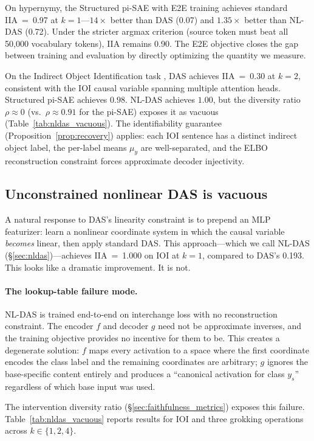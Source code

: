 \documentclass{article}
\begin{document}
On hypernymy, the Structured pi-SAE with E2E training achieves standard
IIA~=~0.97 at $k{=}1$---$14\times$ better than DAS (0.07) and $1.35\times$
better than NL-DAS (0.72). Under the stricter argmax criterion (source token
must beat all 50{,}000 vocabulary tokens), IIA remains 0.90. The E2E objective
closes the gap between training and evaluation by directly optimizing the
quantity we measure.

On the Indirect Object Identification task \citep{wang2022interpretability},
DAS achieves IIA~=~0.30 at $k{=}2$, consistent with the IOI causal
variable spanning multiple attention heads.  Structured pi-SAE achieves
$0.98$.  NL-DAS achieves $1.00$, but the diversity ratio $\rho \approx 0$
(vs.\ $\rho \approx 0.91$ for the pi-SAE) exposes it as vacuous
(Table~\ref{tab:nldas_vacuous}).  The identifiability guarantee
(Proposition~\ref{prop:recovery}) applies: each IOI sentence has a distinct
indirect object label, the per-label means $\mu_y$ are well-separated, and
the ELBO reconstruction constraint forces approximate decoder injectivity.

\subsection{Unconstrained nonlinear DAS is vacuous}
\label{sec:nldas_vacuous}

A natural response to DAS's linearity constraint is to prepend an MLP
featurizer: learn a nonlinear coordinate system in which the causal variable
\emph{becomes} linear, then apply standard DAS. This approach---which we call
NL-DAS (\S\ref{sec:nldas})---achieves IIA~=~1.000 on IOI at $k = 1$, compared
to DAS's 0.193. This looks like a dramatic improvement. It is not.

\paragraph{The lookup-table failure mode.}
NL-DAS is trained end-to-end on interchange loss with no reconstruction
constraint. The encoder $f$ and decoder $g$ need not be approximate inverses,
and the training objective provides no incentive for them to be. This creates a
degenerate solution: $f$ maps every activation to a space where the first
coordinate encodes the class label and the remaining coordinates are arbitrary;
$g$ ignores the base-specific content entirely and produces a ``canonical
activation for class $y_s$'' regardless of which base input was used.

The intervention diversity ratio (\S\ref{sec:faithfulness_metrics}) exposes this
failure. Table~\ref{tab:nldas_vacuous} reports results for IOI and three
grokking operations across $k \in \{1, 2, 4\}$.
\end{document}
